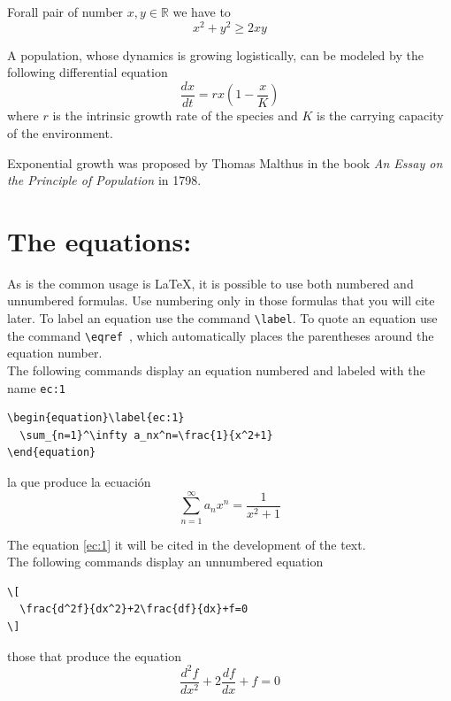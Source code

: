 \documentclass[eng]{MMSB-class-eng}
\begin{document}
\begin{lemma}
 Forall pair of number $x,y\in\mathbb{R}$ we have to
 \[
  x^2+y^2\ge2xy
 \]

\end{lemma}

\begin{example} A population, whose dynamics is growing logistically, can be modeled by the following differential equation
\[
 \frac{dx}{dt}=rx\left(1-\frac{x}{K}\right)
\]
where $r$ is the intrinsic growth rate of the species and $K$ is the carrying capacity of the environment.
 
\end{example}


\begin{remark}
 Exponential growth was proposed by Thomas Malthus in the book \emph{An Essay on the Principle of Population} in 1798.
\end{remark}

\section{The equations:}

As is the common usage is \LaTeX, it is possible to use both numbered and unnumbered formulas. Use numbering only in those formulas that you will cite later. To label an equation use the command \verb!\label!. To quote an equation use the command \verb!\eqref !, which automatically places the parentheses around the equation number. \\

The following commands display an equation numbered and labeled with the name \verb!ec:1!

\begin{verbatim}
\begin{equation}\label{ec:1}
  \sum_{n=1}^\infty a_nx^n=\frac{1}{x^2+1}
\end{equation}
\end{verbatim}
la que produce la ecuaci\'on
\begin{equation}\label{ec:1}
\sum_{n=1}^\infty a_nx^n=\frac{1}{x^2+1}
\end{equation}

The equation \eqref{ec:1} it will be cited in the development of the text.\\

The following commands display an unnumbered equation
\begin{verbatim}
\[
  \frac{d^2f}{dx^2}+2\frac{df}{dx}+f=0
\]
\end{verbatim}
those that produce the equation
\[
 \frac{d^2f}{dx^2}+2\frac{df}{dx}+f=0
\]
\end{document}
